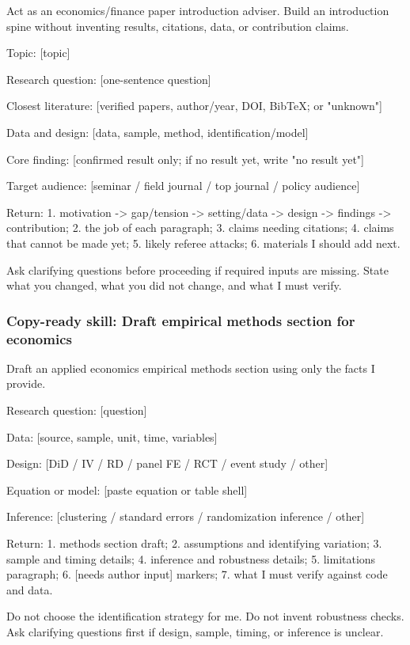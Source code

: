 \documentclass[11pt]{article}
\newcommand{\skill}[1]{\subsubsection*{Copy-ready skill: #1}}
\begin{document}
\begin{promptblock}
Act as an economics/finance paper introduction adviser. Build an introduction
spine without inventing results, citations, data, or contribution claims.

Topic:
[topic]

Research question:
[one-sentence question]

Closest literature:
[verified papers, author/year, DOI, BibTeX; or "unknown"]

Data and design:
[data, sample, method, identification/model]

Core finding:
[confirmed result only; if no result yet, write "no result yet"]

Target audience:
[seminar / field journal / top journal / policy audience]

Return:
1. motivation -> gap/tension -> setting/data -> design -> findings -> contribution;
2. the job of each paragraph;
3. claims needing citations;
4. claims that cannot be made yet;
5. likely referee attacks;
6. materials I should add next.

Ask clarifying questions before proceeding if required inputs are missing.
State what you changed, what you did not change, and what I must verify.
\end{promptblock}

\skill{Draft empirical methods section for economics}

\begin{promptblock}
Draft an applied economics empirical methods section using only the facts I provide.

Research question:
[question]

Data:
[source, sample, unit, time, variables]

Design:
[DiD / IV / RD / panel FE / RCT / event study / other]

Equation or model:
[paste equation or table shell]

Inference:
[clustering / standard errors / randomization inference / other]

Return:
1. methods section draft;
2. assumptions and identifying variation;
3. sample and timing details;
4. inference and robustness details;
5. limitations paragraph;
6. [needs author input] markers;
7. what I must verify against code and data.

Do not choose the identification strategy for me. Do not invent robustness checks.
Ask clarifying questions first if design, sample, timing, or inference is unclear.
\end{promptblock}
\end{document}
